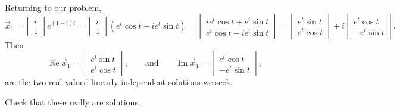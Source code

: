 \documentclass{ximera}
\begin{document}
Returning to our problem,
\begin{equation*}
    \vec{x}_1 =
    \begin{bmatrix} 
        i \\ 
        1 
    \end{bmatrix} 
    e^{(1-i)t}
    =
    \begin{bmatrix} 
        i \\ 
        1 
    \end{bmatrix} 
    \left( e^t \cos t - i e^t \sin t \right)
    =
    \begin{bmatrix}
        i e^t \cos t + e^t \sin t  \\
        e^t \cos t - i e^t \sin t
    \end{bmatrix}
    =
    \begin{bmatrix}
        e^t \sin t  \\
        e^t \cos t
    \end{bmatrix}
    + i
    \begin{bmatrix}
        e^t \cos t  \\
        - e^t \sin t
    \end{bmatrix} .
\end{equation*}
Then
\begin{equation*}
    \operatorname{Re} \vec{x}_1 = 
    \begin{bmatrix}
        e^t \sin t  \\
        e^t \cos t
    \end{bmatrix} ,
    \qquad \text{and} \qquad \operatorname{Im} \vec{x}_1 = 
    \begin{bmatrix}
        e^t \cos t \\
        - e^t \sin t
    \end{bmatrix} ,
\end{equation*}
are the two real-valued linearly independent solutions we seek.

\begin{exercise}
    Check that these really are solutions.
\end{exercise}
\end{document}
